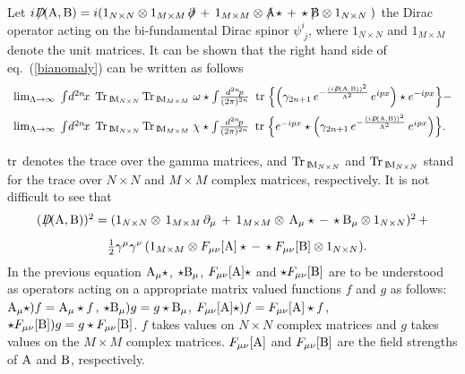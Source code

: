 \documentclass[a4paper,12pt]{article}
\def\A{{\rm A}}
\def\B{{\rm B}}
\def\Aslash{{\A\mkern-12mu/}}
\def\Bslash{{\B\mkern-12mu/}}
\def\Dirac{{D\mkern-12mu/}}
\def\prslash{{\partial\mkern-9mu/}}
\def\prslash{{\partial\mkern-9mu/}}    %
\def\idpn{\int\! \frac{d^{2n}\!p}{(2\pi)^{2n}} \,\,}
\def\idxn{\int\! d^{2n}\!x \,}
\def\ot{\otimes}
\def\MM{{\rm I\!\!\, M}}
\begin{document}
Let $i\Dirac(\A,\B)=i(1_{N\times N}\ot 1_{M\times M}\,
\prslash\,+\,1_{M\times M}\ot \Aslash\star\,+\,
\star\Bslash\,\ot 1_{N\times N}\;)$ the Dirac
operator acting on the bi-fundamental Dirac  spinor $\psi^{i}_{\; j}$, 
where $1_{N\times N}$ and $1_{M\times M}$ denote the unit matrices. It
can be shown that the right hand side of eq.~(\ref{bianomaly}) can be written
as follows
\begin{equation}
\begin{array}{l}
{\mbox{lim}_{\Lambda\rightarrow\infty}\;
\idxn\;{\rm Tr}_{\,\MM_{N\times N}}\,{\rm Tr}_{\,\MM_{M\times M}}\;\omega\star\idpn\,{\rm tr}\;\Big\{
\Big(\gamma_{2n+1}\,e^{-\frac{(i\Dirac(\A,\B))^2}{\Lambda^2}}\,e^{ipx}\Big)\star
e^{-ipx}\Big\}-}\\[9pt]
{\mbox{lim}_{\Lambda\rightarrow\infty}\;
\idxn\;{\rm Tr}_{\,\MM_{N\times N}}\,{\rm Tr}_{\,\MM_{M\times M}}\;
\chi\star\idpn\,{\rm tr}\;\Big\{
e^{-ipx}\star\Big(\gamma_{2n+1}\,e^{-\frac{(i\Dirac(\A,\B))^2}
{\Lambda^2}}\,e^{ipx}\Big)\Big\}.}\\[9pt]
\end{array}
\label{preparecomputation}
\end{equation}
${\rm tr}$ denotes the trace over the gamma matrices, and 
${\rm Tr}_{\,\MM_{N\times N}}$ and
${\rm Tr}_{\,\MM_{N\times N}}$ stand for the trace over  $N\times N$  and 
$M\times M$ complex matrices, respectively. 
It is not difficult to see that
\begin{displaymath}
\begin{array}{l}
{(\Dirac(\A,\B))^2=(1_{N\times N}\ot \,1_{M\times M}\,\partial_{\mu}\,+
\,1_{M\times M}\ot\,\A_{\mu}\star\,-\, \star\B_{\mu}\ot 1_{N\times N})^2\,+}\\[9pt]
{\phantom{(\Dirac(\A,\B))^2=}\frac{1}{2}\gamma^{\mu}\gamma^{\nu}\,(1_{M\times M}\ot F_{\mu\nu}[\A]\star\,-\,\star 
F_{\mu\nu}[\B]\ot 1_{N\times N}).}
\end{array}
\end{displaymath}
In the previous equation $\A_{\mu}\star$, $\star\B_{\mu}$,  
$F_{\mu\nu}[\A]\star$ and $\star F_{\mu\nu}[\B]$ are to be understood as 
operators acting on a appropriate matrix valued functions $f$ and $g$ as 
follows: $\A_{\mu}\star)f=\A_{\mu}\star f$, 
$\star\B_{\mu})g=g \star\B_{\mu}$, 
$F_{\mu\nu}[\A]\star)f=F_{\mu\nu}[\A]\star f$, 
$\star F_{\mu\nu}[\B])g=g \star F_{\mu\nu}[\B]$. $f$ takes values on  
$N\times N$ complex matrices and $g$ takes values on the $M\times M$ complex 
matrices. $F_{\mu\nu}[\A]$ and
$F_{\mu\nu}[\B]$ are the field strengths of $\A$ and $\B$, respectively. 
\end{document}

